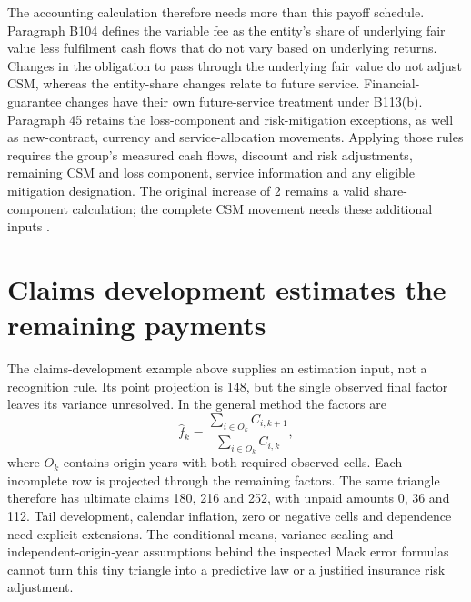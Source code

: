 The accounting calculation therefore needs more than this payoff schedule.
Paragraph B104 defines the variable fee as the entity's share of underlying
fair value less fulfilment cash flows that do not vary based on underlying
returns. Changes in the obligation to pass through the underlying fair value
do not adjust CSM, whereas the entity-share changes relate to future service.
Financial-guarantee changes have their own future-service treatment under
B113(b). Paragraph 45 retains the loss-component and risk-mitigation exceptions,
as well as new-contract, currency and service-allocation movements. Applying
those rules requires the group's measured cash flows, discount and risk
adjustments, remaining CSM and loss component, service information and any
eligible mitigation designation. The original increase of 2 remains a valid
share-component calculation; the complete CSM movement needs these additional
inputs \citep[paragraphs 32--38, 45, 48--50 and B104--B118]{aasb17}.









\section{Claims development estimates the remaining payments}
\label{sec:claims-development-estimation}

The claims-development example above supplies an estimation input, not a
recognition rule. Its point projection is 148, but the single observed final
factor leaves its variance unresolved. In the general method the factors are
\[
 \widehat f_k=\frac{\sum_{i\in O_k} C_{i,k+1}}{\sum_{i\in O_k}C_{i,k}},
\]
where $O_k$ contains origin years with both required observed cells. Each
incomplete row is projected through the remaining factors. The same triangle
therefore has ultimate claims 180, 216 and 252, with unpaid amounts 0, 36 and
112. Tail development, calendar inflation, zero or negative cells and dependence
need explicit extensions. The conditional means, variance scaling and
independent-origin-year assumptions behind the inspected Mack error formulas
\citep[equations (1)--(3), Theorems 1--3]{mack1993} cannot turn this tiny
triangle into a predictive law or a justified insurance risk adjustment.

